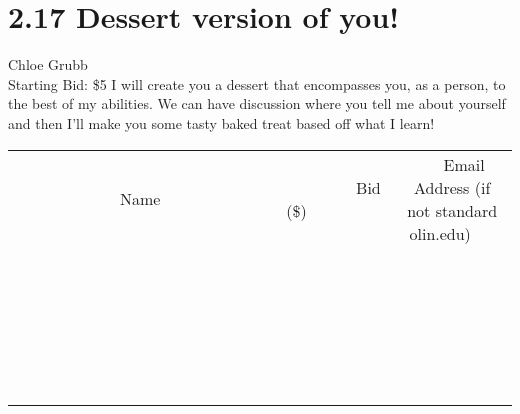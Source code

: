 \documentclass[11pt]{article}
\begin{document}
\section*{2.17 Dessert version of you!}
Chloe Grubb
\\
Starting Bid: \$5
\newline
I will create you a dessert that encompasses you, as a person, to the best of my abilities. We can have  discussion where you tell me about yourself and then I'll make you some tasty baked treat based off what I learn!
\\[6ex]
\begin{tabular}{c c c}
~~~~~~~~~~~~~Name~~~~~~~~~~~~~ & ~~~~~~~~~Bid (\$)~~~~~~~~~  & ~~~Email Address (if not standard olin.edu)~~~\\
 & & \\
\hline
 & & \\
\hline
 & & \\
\hline
 & & \\
\hline
 & & \\
\hline
 & & \\
\hline
 & & \\
\hline
 & & \\
\hline
 & & \\
\hline
 & & \\
\hline
 & & \\
\hline
 & & \\
\hline
 & & \\
\hline
 & & \\
\hline
 & & \\
\hline
 & & \\
\hline
 & & \\
\hline
 & & \\
\hline
 & & \\
\hline
 & & \\
\hline
 & & \\
\hline
 & & \\
\hline
 & & \\
\hline
 & & \\
\hline
 & & \\
\hline
 & & \\
\hline
\end{tabular}
\newpage
\end{document}
